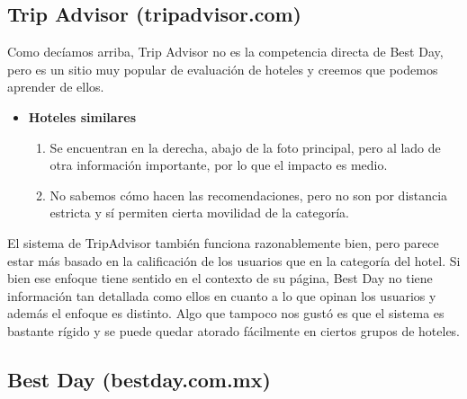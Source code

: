 \documentclass[12pt]{report}
\begin{document}
\subsection*{Trip Advisor (tripadvisor.com)}

Como decíamos arriba, Trip Advisor no es la competencia directa de Best Day, pero es un sitio muy popular de evaluación de hoteles y creemos que podemos aprender de ellos.
\begin{itemize}
	\item \textbf{Hoteles similares}
	\begin{enumerate}
		\item Se encuentran en la derecha, abajo de la foto principal, pero al lado de otra información importante, por lo que el impacto es medio.
		\item No sabemos cómo hacen las recomendaciones, pero no son por distancia estricta y sí permiten cierta movilidad de la categoría.
	\end{enumerate}
\end{itemize}
El sistema de TripAdvisor también funciona razonablemente bien, pero parece estar más basado en la calificación de los usuarios que en la categoría del hotel. Si bien ese enfoque tiene sentido en el contexto de su página, Best Day no tiene información tan detallada como ellos en cuanto a lo que opinan los usuarios y además el enfoque es distinto. Algo que tampoco nos gustó es que el sistema es bastante rígido y se puede quedar atorado fácilmente en ciertos grupos de hoteles.

\subsection*{Best Day (bestday.com.mx)}
\end{document}
